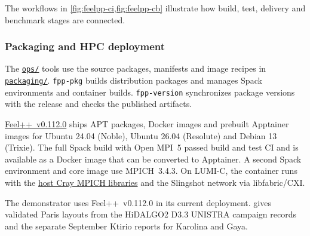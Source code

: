 
The workflows in \cref{fig:feelpp-ci,fig:feelpp-cb} illustrate how build, test,
delivery and benchmark stages are connected.

\subsubsection{Packaging and HPC deployment}
\label{sec:Feelpp:packaging}
The \href{https://github.com/feelpp/feelpp/tree/v0.112.0/ops}{\texttt{ops/}} tools
use the source packages, manifests and image recipes in
\href{https://github.com/feelpp/feelpp/tree/v0.112.0/packaging}{\texttt{packaging/}}.
\texttt{fpp-pkg} builds distribution packages and manages Spack environments
and container builds. \texttt{fpp-version} synchronizes package versions
with the release and checks the published artifacts.

\href{https://github.com/feelpp/feelpp/releases/tag/v0.112.0}{Feel++~v0.112.0}
ships APT packages, Docker images and prebuilt Apptainer images for
Ubuntu 24.04 (Noble), Ubuntu 26.04 (Resolute) and Debian 13 (Trixie).
The full Spack build with Open MPI~5 passed build and test CI and is
available as a Docker image that can be converted to Apptainer.
A second Spack environment and core image use MPICH~3.4.3.
On LUMI-C, the container runs with the
\href{https://docs.lumi-supercomputer.eu/runjobs/scheduled-jobs/container-jobs/\#using-the-host-mpi}{host Cray MPICH libraries}
and the Slingshot network via libfabric/CXI.

The \KtirioUrbanBuildingContext{} demonstrator uses Feel++~v0.112.0 in
its current deployment.  gives
validated Paris layouts from the HiDALGO2 D3.3 UNISTRA campaign records
and the separate September Ktirio reports for Karolina and Gaya.

